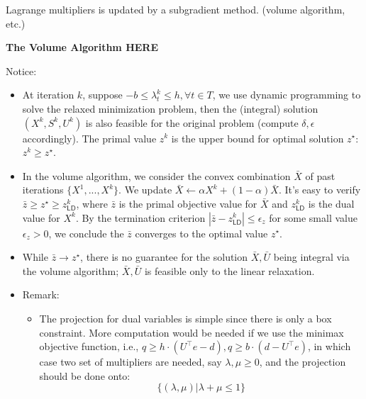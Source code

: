 \documentclass[../main]{subfiles}
\begin{document}
Lagrange multipliers is updated by a subgradient method. (volume
algorithm, etc.)

\textbf{The Volume Algorithm HERE}

Notice:

\begin{itemize}
  \item
        At iteration \(k\), suppose
        \(-b \le \lambda^k_t \le h, \forall t \in T\), we use dynamic
        programming to solve the relaxed minimization problem, then the
        (integral) solution \(( X^k, S^k, U^k)\) is also feasible for the
        original problem (compute \(\delta, \epsilon\) accordingly). The
        primal value \(z^k\) is the upper bound for optimal solution
        \(z^\star\): \(z^k\ge z^\star\).
  \item
        In the volume algorithm, we consider the convex combination \(\bar X\)
        of past iterations \(\{X^1, ..., X^k\}\). We update
        \(\bar X \leftarrow \alpha X^k + (1-\alpha) \bar X\). It's easy to
        verify \(\bar z \ge z^\star \ge z_{\textsf{LD}}^k\), where \(\bar z\)
        is the primal objective value for \(\bar X\) and \(z_{\textsf{LD}}^k\)
        is the dual value for \(X^k\). By the termination criterion
        \(|\bar z - z_{\textsf{LD}}^k| \le \epsilon_z\) for some small value
        \(\epsilon_z >0\), we conclude the \(\bar z\) converges to the optimal
        value \(z^\star\).
  \item
        While \(\bar z \to z^\star\), there is no guarantee for the solution
        \(\bar X, \bar U\) being integral via the volume algorithm;
        \(\bar X, \bar U\) is feasible only to the linear relaxation.
  \item
        Remark:

        \begin{itemize}
          \tightlist
          \item
                The projection for dual variables is simple since there is only a
                box constraint. More computation would be needed if we use the
                minimax objective function, i.e.,
                \(q \ge h\cdot (U^\top e - d), q\ge b\cdot (d-U^\top e)\), in which
                case two set of multipliers are needed, say \(\lambda, \mu \ge 0\),
                and the projection should be done onto:
                \[\{(\lambda,\mu)|\lambda +\mu \le 1\}\]
        \end{itemize}
\end{itemize}
\end{document}
